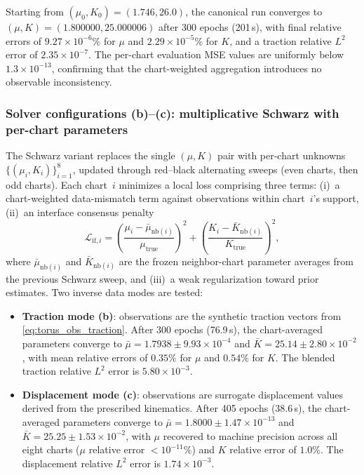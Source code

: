 \documentclass[sort&compress]{svjour3} %
\begin{document}
Starting from $(\mu_0,K_0)=(1.746,26.0)$, the canonical run converges to $(\mu,K)=(1.800000,25.000006)$ after 300 epochs (201\,s), with final relative errors of $9.27\times 10^{-6}\%$ for $\mu$ and $2.29\times 10^{-5}\%$ for $K$, and a traction relative $L^2$ error of $2.35\times 10^{-7}$. The per-chart evaluation MSE values are uniformly below $1.3\times10^{-13}$, confirming that the chart-weighted aggregation introduces no observable inconsistency.

\subsubsection{Solver configurations (b)--(c): multiplicative Schwarz with per-chart parameters}

The Schwarz variant replaces the single $(\mu,K)$ pair with per-chart unknowns $\{(\mu_i,K_i)\}_{i=1}^{8}$, updated through red--black alternating sweeps (even charts, then odd charts). Each chart~$i$ minimizes a local loss comprising three terms: (i)~a chart-weighted data-mismatch term against observations within chart~$i$'s support, (ii)~an interface consensus penalty
\begin{equation}
\mathcal{L}_{\mathrm{if},i}
=
\left(\frac{\mu_i - \bar{\mu}_{\mathrm{nb}(i)}}{\mu_{\mathrm{true}}}\right)^2
+
\left(\frac{K_i - \bar{K}_{\mathrm{nb}(i)}}{K_{\mathrm{true}}}\right)^2,
\label{eq:torus_schwarz_interface}
\end{equation}
where $\bar{\mu}_{\mathrm{nb}(i)}$ and $\bar{K}_{\mathrm{nb}(i)}$ are the frozen neighbor-chart parameter averages from the previous Schwarz sweep, and (iii)~a weak regularization toward prior estimates. Two inverse data modes are tested:

\begin{itemize}
\item \textbf{Traction mode (b)}: observations are the synthetic traction vectors from \eqref{eq:torus_obs_traction}. After 300 epochs (76.9\,s), the chart-averaged parameters converge to $\bar{\mu}=1.7938\pm 9.93\times10^{-4}$ and $\bar{K}=25.14\pm 2.80\times10^{-2}$, with mean relative errors of $0.35\%$ for $\mu$ and $0.54\%$ for $K$. The blended traction relative $L^2$ error is $5.80\times10^{-3}$.

\item \textbf{Displacement mode (c)}: observations are surrogate displacement values derived from the prescribed kinematics. After 405 epochs (38.6\,s), the chart-averaged parameters converge to $\bar{\mu}=1.8000\pm 1.47\times10^{-13}$ and $\bar{K}=25.25\pm 1.53\times10^{-2}$, with $\mu$ recovered to machine precision across all eight charts ($\mu$ relative error $< 10^{-11}\%$) and $K$ relative error of $1.0\%$. The displacement relative $L^2$ error is $1.74\times10^{-3}$.
\end{itemize}
\end{document}
